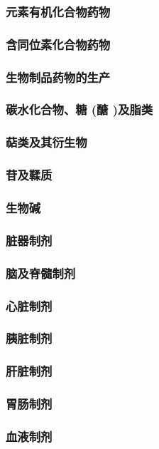 \documentclass[UTF8]{../../ApplicationUniverse}
\begin{document}
    \subsubsection{元素有机化合物药物}
    \subsubsection{含同位素化合物药物}
\subsubsection{生物制品药物的生产}
    \subsubsection{碳水化合物、糖 (醣 )及脂类}
    \subsubsection{萜类及其衍生物}
    \subsubsection{苷及鞣质}
    \subsubsection{生物碱}
    \subsubsection{脏器制剂}
        \subsubsection{脑及脊髓制剂}
        \subsubsection{心脏制剂}
        \subsubsection{胰脏制剂}
        \subsubsection{肝脏制剂}
        \subsubsection{胃肠制剂}
        \subsubsection{血液制剂}
\end{document}
